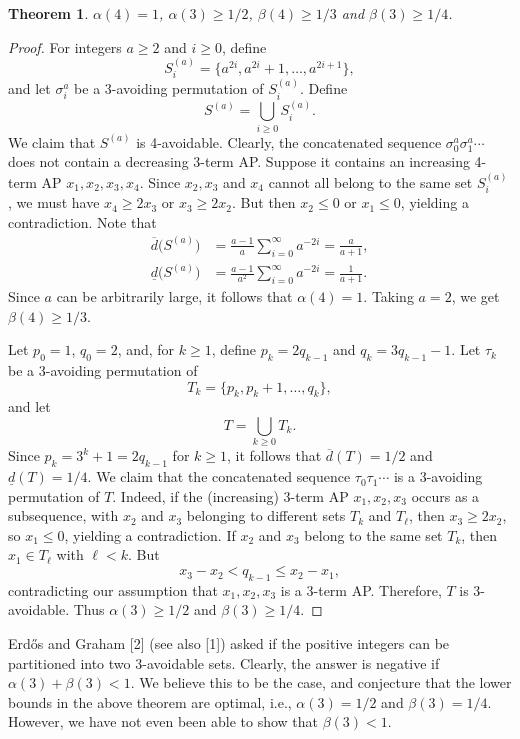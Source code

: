 \documentclass[10pt]{article}
\newtheorem{theorem}{Theorem}
\newcommand{\udens}{\overline{d}}
\newcommand{\ldens}{\underline{d}}
\begin{document}
\begin{theorem}
$\alpha(4)=1$, $\alpha(3)\geq 1/2$, $\beta(4)\geq 1/3$ and
$\beta(3)\geq 1/4$.
\end{theorem}

\begin{proof}
For integers $a\geq 2$ and $i\geq 0$, define
\[
  S_i^{(a)}=\{a^{2i},a^{2i}+1,\ldots,a^{2i+1}\},
\]
and let $\sigma_i^a$ be a 3-avoiding permutation of $S_i^{(a)}$. Define
\[
  S^{(a)}=\bigcup_{i\geq 0}S_i^{(a)}.
\]
We claim that $S^{(a)}$ is 4-avoidable. Clearly, the concatenated sequence
$\sigma_0^a\sigma_1^a\cdots$ does not contain a decreasing 3-term AP. Suppose
it contains an increasing 4-term AP $x_1,x_2,x_3,x_4$. Since $x_2,x_3$ and
$x_4$ cannot all belong to the same set $S_i^{(a)}$, we must have
$x_4\geq 2x_3$ or $x_3\geq 2x_2$. But then $x_2\leq 0$ or $x_1\leq 0$,
yielding a contradiction. Note that
\[
\begin{aligned}
  \udens\bigl(S^{(a)}\bigr)
    &=\frac{a-1}{a}\sum_{i=0}^{\infty}a^{-2i}
      =\frac{a}{a+1},\\
  \ldens\bigl(S^{(a)}\bigr)
    &=\frac{a-1}{a^2}\sum_{i=0}^{\infty}a^{-2i}
      =\frac{1}{a+1}.
\end{aligned}
\]
Since $a$ can be arbitrarily large, it follows that $\alpha(4)=1$. Taking
$a=2$, we get $\beta(4)\geq 1/3$.

Let $p_0=1$, $q_0=2$, and, for $k\geq 1$, define
$p_k=2q_{k-1}$ and $q_k=3q_{k-1}-1$. Let $\tau_k$ be a 3-avoiding
permutation of
\[
  T_k=\{p_k,p_k+1,\ldots,q_k\},
\]
and let
\[
  T=\bigcup_{k\geq 0}T_k.
\]
Since $p_k=3^k+1=2q_{k-1}$ for $k\geq 1$, it follows that
$\udens(T)=1/2$ and $\ldens(T)=1/4$. We claim that the concatenated sequence
$\tau_0\tau_1\cdots$ is a 3-avoiding permutation of $T$. Indeed, if the
(increasing) 3-term AP $x_1,x_2,x_3$ occurs as a subsequence, with $x_2$ and
$x_3$ belonging to different sets $T_k$ and $T_\ell$, then $x_3\geq 2x_2$,
so $x_1\leq 0$, yielding a contradiction. If $x_2$ and $x_3$ belong to the
same set $T_k$, then $x_1\in T_\ell$ with $\ell<k$. But
\[
  x_3-x_2<q_{k-1}\leq x_2-x_1,
\]
contradicting our assumption that $x_1,x_2,x_3$ is a 3-term AP. Therefore,
$T$ is 3-avoidable. Thus $\alpha(3)\geq 1/2$ and $\beta(3)\geq 1/4$.
\end{proof}

Erd\H{o}s and Graham [2] (see also [1]) asked if the positive integers can be
partitioned into two 3-avoidable sets. Clearly, the answer is negative if
$\alpha(3)+\beta(3)<1$. We believe this to be the case, and conjecture that
the lower bounds in the above theorem are optimal, i.e., $\alpha(3)=1/2$ and
$\beta(3)=1/4$. However, we have not even been able to show that
$\beta(3)<1$.
\end{document}

